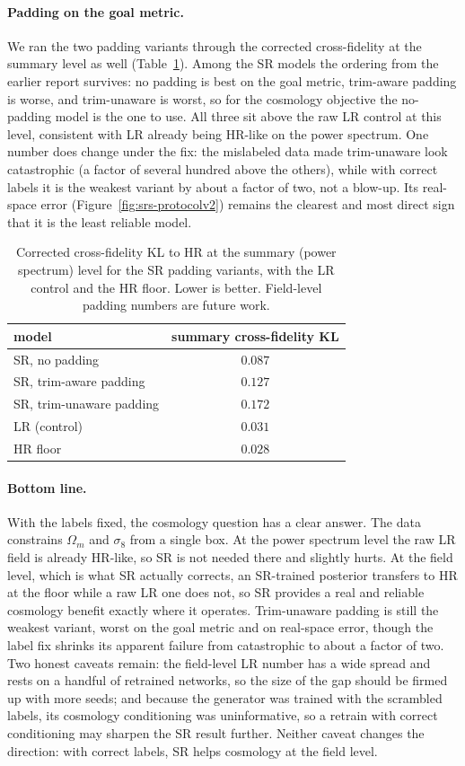 \paragraph{Padding on the goal metric.} We ran the two padding variants through
the corrected cross-fidelity at the summary level as well
(Table~\ref{tab:srs-padding}). Among the SR models the ordering from the earlier
report survives: no padding is best on the goal metric, trim-aware padding is
worse, and trim-unaware is worst, so for the cosmology objective the no-padding
model is the one to use. All three sit above the raw LR control at this level,
consistent with LR already being HR-like on the power spectrum. One number does
change under the fix: the mislabeled data made trim-unaware look catastrophic (a
factor of several hundred above the others), while with correct labels it is the
weakest variant by about a factor of two, not a blow-up. Its real-space error
(Figure~\ref{fig:srs-protocolv2}) remains the clearest and most direct sign that
it is the least reliable model.
\begin{table}[h]
\centering
\caption{Corrected cross-fidelity KL to HR at the summary (power spectrum) level
for the SR padding variants, with the LR control and the HR floor. Lower is
better. Field-level padding numbers are future work.}
\label{tab:srs-padding}
\begin{tabular}{lc}
\toprule
model & summary cross-fidelity KL \\
\midrule
SR, no padding & $\mathbf{0.087}$ \\
SR, trim-aware padding & $0.127$ \\
SR, trim-unaware padding & $0.172$ \\
\midrule
LR (control) & $0.031$ \\
HR floor & $0.028$ \\
\bottomrule
\end{tabular}
\end{table}

\paragraph{Bottom line.} With the labels fixed, the cosmology question has a
clear answer. The data constrains $\Omega_m$ and $\sigma_8$ from a single box. At
the power spectrum level the raw LR field is already HR-like, so SR is not needed
there and slightly hurts. At the field level, which is what SR actually corrects,
an SR-trained posterior transfers to HR at the floor while a raw LR one does not,
so SR provides a real and reliable cosmology benefit exactly where it operates.
Trim-unaware padding is still the weakest variant, worst on the goal metric and
on real-space error, though the label fix shrinks its apparent failure from
catastrophic to about a factor of two. Two honest caveats remain: the
field-level LR number has a wide spread and rests on a handful of retrained
networks, so the size of the gap should be firmed up with more seeds; and because
the generator was trained with the scrambled labels, its cosmology conditioning
was uninformative, so a retrain with correct conditioning may sharpen the SR
result further. Neither caveat changes the direction: with correct labels, SR
helps cosmology at the field level.

